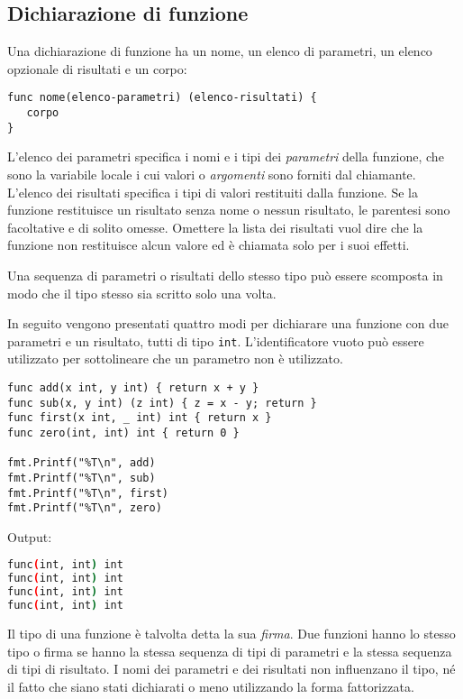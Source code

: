 \documentclass[../../thesis.tex]{subfiles}
\begin{document}
    \subsection{Dichiarazione di funzione}\label{subsec:dichiarazione-di-funzione}
    Una dichiarazione di funzione ha un nome, un elenco di parametri, un elenco opzionale di risultati e un corpo:
    \begin{lstlisting}[label={lst:lstlisting4-1.1}]
func nome(elenco-parametri) (elenco-risultati) {
   corpo
}
    \end{lstlisting}
    L'elenco dei parametri specifica i nomi e i tipi dei \textit{parametri} della funzione, che sono la variabile locale i cui valori o \textit{argomenti} sono forniti dal chiamante.
    L'elenco dei risultati specifica i tipi di valori restituiti dalla funzione.
    Se la funzione restituisce un risultato senza nome o nessun risultato, le parentesi sono facoltative e di solito omesse.
    Omettere la lista dei risultati vuol dire che la funzione non restituisce alcun valore ed è chiamata solo per i suoi effetti.
    \hfill \vspace{12pt}

    Una sequenza di parametri o risultati dello stesso tipo può essere scomposta in modo che il tipo stesso sia scritto solo una volta.
    \hfill \vspace{12pt}

    In seguito vengono presentati quattro modi per dichiarare una funzione con due parametri e un risultato, tutti di tipo \verb"int".
    L'identificatore vuoto può essere utilizzato per sottolineare che un parametro non è utilizzato.
    \begin{lstlisting}[frame = single,label={lst:lstlisting4-1.2}]
func add(x int, y int) { return x + y }
func sub(x, y int) (z int) { z = x - y; return }
func first(x int, _ int) int { return x }
func zero(int, int) int { return 0 }

fmt.Printf("%T\n", add)
fmt.Printf("%T\n", sub)
fmt.Printf("%T\n", first)
fmt.Printf("%T\n", zero)
    \end{lstlisting}
    Output:
    \begin{lstlisting}[language = bash, frame = L,label={lst:lstlisting4-1.3}]
func(int, int) int
func(int, int) int
func(int, int) int
func(int, int) int
    \end{lstlisting}
    Il tipo di una funzione è talvolta detta la sua \textit{firma}.
    Due funzioni hanno lo stesso tipo o firma se hanno la stessa sequenza di tipi di parametri e la stessa sequenza di tipi di risultato.
    I nomi dei parametri e dei risultati non influenzano il tipo, né il fatto che siano stati dichiarati o meno utilizzando la forma fattorizzata.
    \hfill \vspace{12pt}
\end{document}
